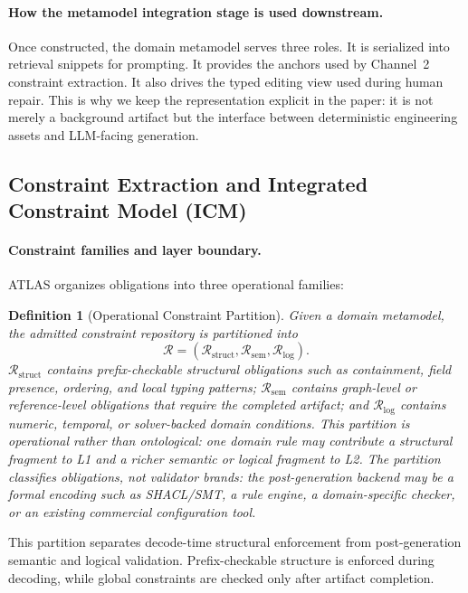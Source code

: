 \documentclass[acmlarge,nonacm]{acmart}
\theoremstyle{acmplain}
\theoremstyle{acmdefinition}
\newtheorem{definition}{Definition}[section]
\begin{document}
\paragraph{How the metamodel integration stage is used downstream.}
Once constructed, the domain metamodel serves three roles. It is serialized into retrieval snippets for prompting. It provides the anchors used by Channel~2 constraint extraction. It also drives the typed editing view used during human repair. This is why we keep the representation explicit in the paper: it is not merely a background artifact but the interface between deterministic engineering assets and LLM-facing generation.

\subsection{Constraint Extraction and Integrated Constraint Model (ICM)}
\label{sec:icm}

\paragraph{Constraint families and layer boundary.}
ATLAS organizes obligations into three operational families:

\begin{definition}[Operational Constraint Partition]
\label{def:constraint-space}
Given a domain metamodel, the admitted constraint repository is partitioned into
\[
\mathcal{R}
=
(\mathcal{R}_{\mathrm{struct}},
 \mathcal{R}_{\mathrm{sem}},
 \mathcal{R}_{\mathrm{log}}).
\]
$\mathcal{R}_{\mathrm{struct}}$ contains prefix-checkable structural obligations such as containment, field presence, ordering, and local typing patterns; $\mathcal{R}_{\mathrm{sem}}$ contains graph-level or reference-level obligations that require the completed artifact; and $\mathcal{R}_{\mathrm{log}}$ contains numeric, temporal, or solver-backed domain conditions. This partition is operational rather than ontological: one domain rule may contribute a structural fragment to L1 and a richer semantic or logical fragment to L2. The partition classifies obligations, not validator brands: the post-generation backend may be a formal encoding such as SHACL/SMT, a rule engine, a domain-specific checker, or an existing commercial configuration tool.
\end{definition}

This partition separates decode-time structural enforcement from post-generation semantic and logical validation. Prefix-checkable structure is enforced during decoding, while global constraints are checked only after artifact completion.
\end{document}
